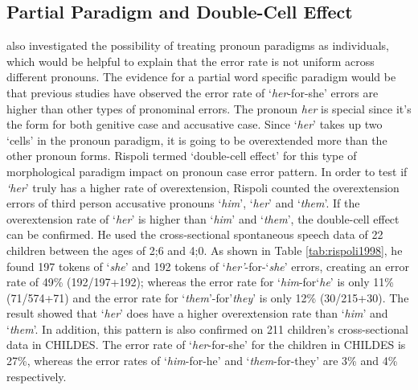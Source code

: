 \subsection{Partial Paradigm and Double-Cell Effect}
\cite{rispoli1998patterns} also investigated the possibility of treating pronoun paradigms as individuals, which would be helpful to explain that the error rate is not uniform across different pronouns. The evidence for a partial word specific paradigm would be that previous studies have observed the error rate of `\textit{her}-for-she' errors are higher than other types of pronominal errors. The pronoun \textit{her} is special since it's the form for both genitive case and accusative case. Since `\textit{her}' takes up two `cells' in the pronoun paradigm, it is going to be overextended more than the other pronoun forms. Rispoli termed `double-cell effect' for this type of morphological paradigm impact on pronoun case error pattern. In order to test if \textit{`her}' truly has a higher rate of overextension, Rispoli counted the overextension errors of third person accusative pronouns `\textit{him}', `\textit{her}' and `\textit{them}'. If the overextension rate of `\textit{her}' is higher than `\textit{him}' and `\textit{them}', the double-cell effect can be confirmed. He used the cross-sectional spontaneous speech data of 22 children between the ages of 2;6 and 4;0. As shown in Table \ref{tab:rispoli1998}, he found 197 tokens of `\textit{she}' and 192 tokens of `\textit{her'}-for-`\textit{she}' errors, creating an error rate of 49\% (192/197+192); whereas the error rate for `\textit{him}-for`\textit{he}' is only 11\% (71/574+71) and the error rate for `\textit{them}'-for'\textit{they}' is only 12\% (30/215+30). The result showed that `\textit{her}' does have a higher overextension rate than `\textit{him}' and `\textit{them}'. In addition, this pattern is also confirmed on 211 children's cross-sectional data in CHILDES. The error rate of `\textit{her}-for-she' for the children in CHILDES is 27\%, whereas the error rates of `\textit{him}-for-he' and `\textit{them}-for-they' are 3\% and 4\% respectively.  

